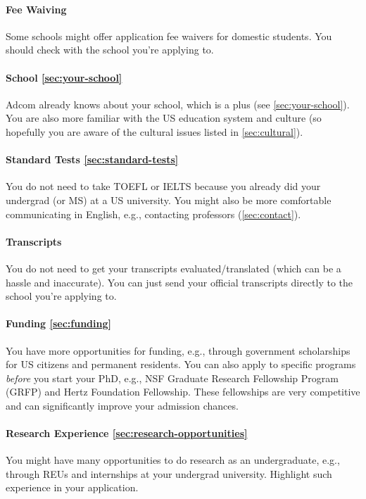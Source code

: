 \documentclass[oneside,11pt,dvipsnames]{book}
\begin{document}
\paragraph{Fee Waiving} Some schools might offer application fee waivers for domestic students.  You should check with the school you're applying to.

\paragraph{School \autoref{sec:your-school}} Adcom already knows about your school, which is a plus (see \autoref{sec:your-school}). You are also more familiar with the US education system and culture (so hopefully you are aware of the cultural issues listed in \autoref{sec:cultural}).

\paragraph{Standard Tests \autoref{sec:standard-tests}} You do not need to take TOEFL or IELTS because you already did your undergrad (or MS) at a US university.  You might also be more comfortable communicating in English, e.g., contacting professors (\autoref{sec:contact}).

\paragraph{Transcripts} You do not need to get your transcripts evaluated/translated (which can be a hassle and inaccurate).  You can just send your official transcripts directly to the school you're applying to.

\paragraph{Funding \autoref{sec:funding}} You have more opportunities for funding, e.g., through government scholarships for US citizens and permanent residents.  You can also apply to specific programs \emph{before} you start your PhD, e.g., NSF Graduate Research Fellowship Program (GRFP) and Hertz Foundation Fellowship.  These fellowships are very competitive and can significantly improve your admission chances.

\paragraph{Research Experience \autoref{sec:research-opportunities}} You might have many opportunities to do research as an undergraduate, e.g., through REUs and internships at your undergrad university.  Highlight such experience in your application.
\end{document}
